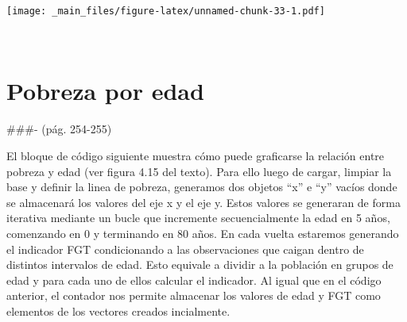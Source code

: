 \documentclass[
]{book}
\begin{document}
\texttt{[image: \_main\_files/figure-latex/unnamed-chunk-33-1.pdf]}

~

\hypertarget{pobreza-por-edad}{%
\section{Pobreza por edad}\label{pobreza-por-edad}}

\#\#\#- (pág. 254-255)

El bloque de código siguiente muestra cómo puede graficarse la relación entre pobreza y edad (ver figura 4.15 del texto). Para ello luego de cargar, limpiar la base y definir la linea de pobreza, generamos dos objetos ``x'' e ``y'' vacíos donde se almacenará los valores del eje x y el eje y. Estos valores se generaran de forma iterativa mediante un bucle que incremente secuencialmente la edad en 5 años, comenzando en 0 y terminando en 80 años. En cada vuelta estaremos generando el indicador FGT condicionando a las observaciones que caigan dentro de distintos intervalos de edad. Esto equivale a dividir a la población en grupos de edad y para cada uno de ellos calcular el indicador. Al igual que en el código anterior, el contador nos permite almacenar los valores de edad y FGT como elementos de los vectores creados incialmente.
\end{document}
